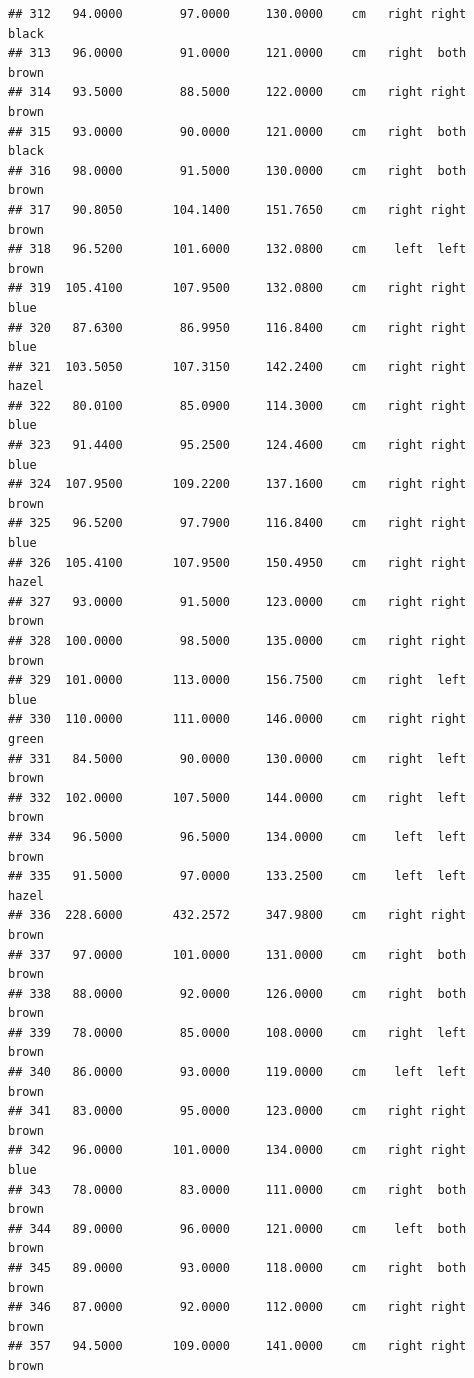 \documentclass[]{article}
\begin{document}
\begin{verbatim}
## 312   94.0000        97.0000     130.0000    cm   right right      black
## 313   96.0000        91.0000     121.0000    cm   right  both      brown
## 314   93.5000        88.5000     122.0000    cm   right right      brown
## 315   93.0000        90.0000     121.0000    cm   right  both      black
## 316   98.0000        91.5000     130.0000    cm   right  both      brown
## 317   90.8050       104.1400     151.7650    cm   right right      brown
## 318   96.5200       101.6000     132.0800    cm    left  left      brown
## 319  105.4100       107.9500     132.0800    cm   right right       blue
## 320   87.6300        86.9950     116.8400    cm   right right       blue
## 321  103.5050       107.3150     142.2400    cm   right right      hazel
## 322   80.0100        85.0900     114.3000    cm   right right       blue
## 323   91.4400        95.2500     124.4600    cm   right right       blue
## 324  107.9500       109.2200     137.1600    cm   right right      brown
## 325   96.5200        97.7900     116.8400    cm   right right       blue
## 326  105.4100       107.9500     150.4950    cm   right right      hazel
## 327   93.0000        91.5000     123.0000    cm   right right      brown
## 328  100.0000        98.5000     135.0000    cm   right right      brown
## 329  101.0000       113.0000     156.7500    cm   right  left       blue
## 330  110.0000       111.0000     146.0000    cm   right right      green
## 331   84.5000        90.0000     130.0000    cm   right  left      brown
## 332  102.0000       107.5000     144.0000    cm   right  left      brown
## 334   96.5000        96.5000     134.0000    cm    left  left      brown
## 335   91.5000        97.0000     133.2500    cm    left  left      hazel
## 336  228.6000       432.2572     347.9800    cm   right right      brown
## 337   97.0000       101.0000     131.0000    cm   right  both      brown
## 338   88.0000        92.0000     126.0000    cm   right  both      brown
## 339   78.0000        85.0000     108.0000    cm   right  left      brown
## 340   86.0000        93.0000     119.0000    cm    left  left      brown
## 341   83.0000        95.0000     123.0000    cm   right right      brown
## 342   96.0000       101.0000     134.0000    cm   right right       blue
## 343   78.0000        83.0000     111.0000    cm   right  both      brown
## 344   89.0000        96.0000     121.0000    cm    left  both      brown
## 345   89.0000        93.0000     118.0000    cm   right  both      brown
## 346   87.0000        92.0000     112.0000    cm   right right      brown
## 357   94.5000       109.0000     141.0000    cm   right right      brown

\end{verbatim}
\end{document}
